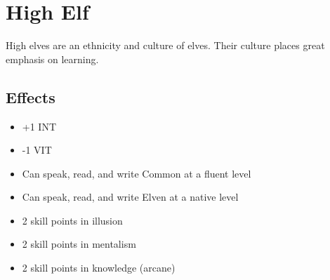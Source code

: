 \section{High Elf}\label{culture:high-elf}
High elves are an ethnicity and culture of elves. Their culture places great
emphasis on learning.

\subsection*{Effects}
\begin{itemize}
    \item +1 INT
    \item -1 VIT
    \item Can speak, read, and write Common at a fluent level
    \item Can speak, read, and write Elven at a native level
    \item 2 skill points in illusion
    \item 2 skill points in mentalism
    \item 2 skill points in knowledge (arcane)
\end{itemize}
